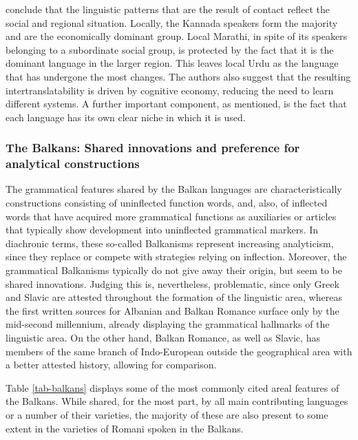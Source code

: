 \documentclass[output=paper,
modfonts
]{langscibook}
\begin{document}
\textcite{gumperzetal1971convergence} conclude that the linguistic patterns that are the result of contact reflect the social and regional situation. Locally, the Kannada speakers form the majority and are the economically dominant group. Local Marathi, in spite of its speakers belonging to a subordinate social group, is protected by the fact that it is the dominant language in the larger region. This leaves local Urdu as the language that has undergone the most changes. The authors also suggest that the resulting intertranslatability is driven by cognitive economy, reducing the need to learn different systems. A further important component, as mentioned, is the fact that each language has its own clear niche in which it is used.\\

\subsubsection*{The Balkans: Shared innovations and preference for analytical constructions}

\noindent The grammatical features shared by the Balkan languages are characteristically constructions consisting of uninflected function words, and, also, of inflected words that have acquired more grammatical functions as auxiliaries or articles that typically show development into uninflected grammatical markers. In diachronic terms, these so-called Balkanisms represent increasing analyticism, since they replace or compete with strategies relying on inflection. Moreover, the grammatical Balkanisms typically do not give away their origin, but seem to be shared innovations. Judging this is, nevertheless, problematic, since only Greek and Slavic are attested throughout the formation of the linguistic area, whereas the first written sources for Albanian and Balkan Romance surface only by the mid-second millennium, already displaying the grammatical hallmarks of the linguistic area. On the other hand, Balkan Romance, as well as Slavic, has members of the same branch of Indo-European outside the geographical area with a better attested history, allowing for comparison.

Table \ref{tab-balkans} displays some of the most commonly cited areal features of the Balkans. While shared, for the most part, by all main contributing languages or a number of their varieties, the majority of these are also present to some extent in the varieties of Romani spoken in the Balkans.
\end{document}
